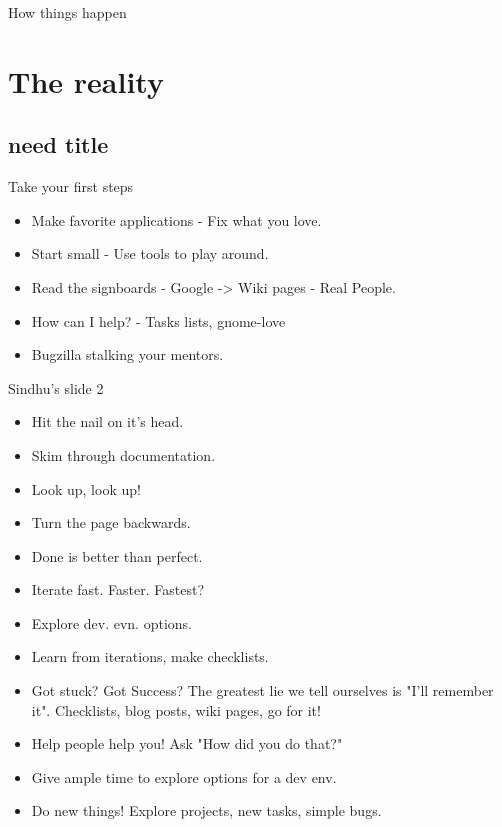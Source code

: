 \documentclass{beamer}
\begin{document}
\begin{frame}{How things happen}
\end{frame}


\section{The reality}

\subsection{need title}

\begin{frame}{Take your first steps}
  \begin{itemize}
   \item
    Make favorite applications - Fix what you love.
  \item
    Start small - Use tools to play around.
  \item
    Read the signboards - Google -> Wiki pages - Real People.
  \item
    How can I help? - Tasks lists, gnome-love
  \item
    Bugzilla stalking your mentors.
  \end{itemize} 
\end{frame}

\begin{frame}{Sindhu's slide 2}
  \begin{itemize}
  \item
    Hit the nail on it's head.
  \item
    Skim through documentation.
  \item
    Look up, look up! 
  \item
    Turn the page backwards.
  \item
    Done is better than perfect.
  \item
    Iterate fast. Faster. Fastest? 
  \item
    Explore dev. evn. options.
  \item
    Learn from iterations, make checklists.
  \item
    Got stuck? Got Success? The greatest lie we tell ourselves is "I'll remember it". Checklists, blog posts, wiki pages, go for it!
  \item
    Help people help you! Ask "How did you do that?"
  \item
    Give ample time to explore options for a dev env. 
  \item
    Do new things! Explore projects, new tasks, simple bugs.
  \end{itemize} 

\end{frame}
\end{document}
